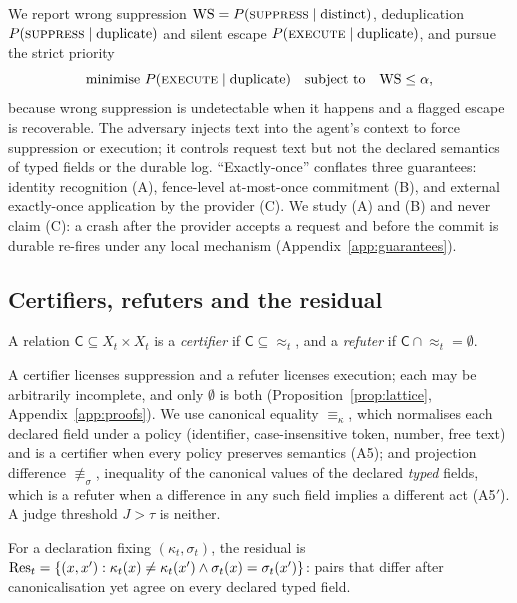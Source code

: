 We report wrong suppression $\mathrm{WS}=P(\textsc{suppress}\mid\text{distinct})$, deduplication $P(\textsc{suppress}\mid\text{duplicate})$ and silent escape $P(\textsc{execute}\mid\text{duplicate})$, and pursue the strict priority
\begin{equation}\label{eq:objective}
\text{minimise } P(\textsc{execute}\mid\text{duplicate}) \quad\text{subject to}\quad \mathrm{WS}\le\alpha ,
\end{equation}
because wrong suppression is undetectable when it happens and a flagged escape is recoverable. The adversary injects text into the agent's context \citep{greshake2023injection} to force suppression or execution; it controls request text but not the declared semantics of typed fields or the durable log. ``Exactly-once'' conflates three guarantees: identity recognition (A), fence-level at-most-once commitment (B), and external exactly-once application by the provider (C). We study (A) and (B) and never claim (C): a crash after the provider accepts a request and before the commit is durable re-fires under any local mechanism (Appendix~\ref{app:guarantees}).

\subsection{Certifiers, refuters and the residual}

\begin{definition}\label{def:certifier}\label{def:refuter}
A relation $\mathsf{C}\subseteq X_t\times X_t$ is a \emph{certifier} if $\mathsf{C}\subseteq{\approx_t}$, and a \emph{refuter} if $\mathsf{C}\cap{\approx_t}=\emptyset$.
\end{definition}

A certifier licenses suppression and a refuter licenses execution; each may be arbitrarily incomplete, and only $\emptyset$ is both (Proposition~\ref{prop:lattice}, Appendix~\ref{app:proofs}). We use canonical equality $\equiv_\kappa$, which normalises each declared field under a policy (identifier, case-insensitive token, number, free text) and is a certifier when every policy preserves semantics (A5); and projection difference $\not\equiv_\sigma$, inequality of the canonical values of the declared \emph{typed} fields, which is a refuter when a difference in any such field implies a different act (A5$'$). A judge threshold $J>\tau$ is neither.

\begin{definition}[Residual]\label{def:residual}
For a declaration fixing $(\kappa_t,\sigma_t)$, the residual is $\mathrm{Res}_t=\{(x,x'):\kappa_t(x)\ne\kappa_t(x')\wedge\sigma_t(x)=\sigma_t(x')\}$: pairs that differ after canonicalisation yet agree on every declared typed field.
\end{definition}

